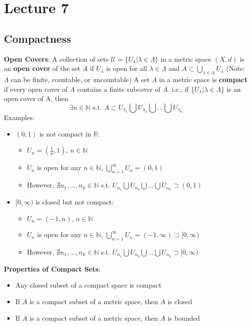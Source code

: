 \documentclass{article}
\newcommand{\union}{\bigcup}
\newcommand{\N}{\mathbb{N}}
\newcommand{\R}{\mathbb{R}}
\begin{document}
\section{Lecture 7}

\subsection{Compactness}
\textbf{Open Covers}: A collection of sets $\mathcal{U}=\{U_\lambda|\lambda\in\Lambda\}$ in a metric space $(X,d)$ is an \textbf{open cover} of the set $A$ if $U_\lambda$ is open for all $\lambda\in\Lambda$ and $A\subset\union_{\lambda\in\Lambda}U_\lambda$ (Note: $\Lambda$ can be finite, countable, or uncountable)
\smallskip
A set $A$ in a metric space is \textbf{compact} if every open cover of $A$ contains a finite subcover of $A$. i.e., if $\{U_\lambda|\lambda\in\Lambda\}$ is an open cover of A, then 
\[
	\exists n\in\N\text{ s.t. }A\subset U_{\lambda_1}\union U_{\lambda_2}\union...\union U_{\lambda_n}
\]
Examples:
\begin{itemize}
	\item $(0,1)$ is not compact in $\R$:
		\begin{itemize}
			\item $U_n=\left(\frac{1}{n},1\right)$, $n\in\N$ 
			\item $U_n$ is open for any $n\in\N$, $\union_{n=1}^\infty U_n = (0,1)$
			\item However, $\nexists n_1,...,n_k\in\N$ s.t. $U_{n_1}\union U_{n_2}\union ...\union U_{n_k}\supset (0,1)$
		\end{itemize}
	\item $[0,\infty)$ is closed but not compact:
		\begin{itemize}
			\item $U_n=(-1,n)$, $n\in\N$ 
			\item $U_n$ is open for any $n\in\N$, $\union_{n=1}^\infty U_n=(-1,\infty)\supset[0,\infty)$
			\item However, $\nexists n_1,...,n_k\in\N$ s.t. $U_{n_1}\union U_{n_2}\union ...\union U_{n_k}\supset [0,\infty)$
		\end{itemize}
\end{itemize}
\bigskip
\textbf{Properties of Compact Sets}:
\begin{itemize}
	\item Any closed subset of a compact space is compact
	\item If $A$ is a compact subset of a metric space, then $A$ is closed 
	\item If $A$ is a compact subset of a metric space, then $A$ is bounded
\end{itemize}
\end{document}
